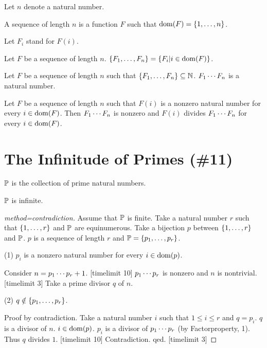 \documentclass{article}
\begin{document}
\begin{forthel}
  Let $n$ denote a natural number.

\begin{definition}
A sequence of length $n$ is a
function $F$ such that $\operatorname{dom}(F) = \{1,\dots,n\}$.
\end{definition}

Let $F_{i}$ stand for $F(i)$.

\begin{definition}
Let $F$ be a sequence of length $n$.
$\{F_{1},\dots,F_{n}\} = \{ F_{i} | i \in \operatorname{dom}(F)\}$.
\end{definition}





\begin{signature}
Let $F$ be a sequence of length $n$
such that $\{F_{1},\dots,F_{n}\} \subseteq \mathbb{N}$.
$F_{1} \cdots F_{n}$ is a natural number.
\end{signature}

\begin{axiom}[title=Factorproperty]
Let $F$ be a sequence of length $n$
such that $F(i)$ is a nonzero natural number for every $i \in \operatorname{dom}(F)$.
Then $F_{1} \cdots F_{n}$ is nonzero and
$F(i)$ divides $F_{1} \cdots F_{n}$ for every $i \in \operatorname{dom}(F)$.
\end{axiom}

\end{forthel}

\section{The Infinitude of Primes (\#11)}

\begin{forthel}

\begin{signature}
$\mathbb{P}$ is the collection of prime natural numbers.
\end{signature}

\begin{theorem}[title=Euclid]
$\mathbb{P}$ is infinite.
\end{theorem}
\begin{proof}[method=contradiction]
Assume that $\mathbb{P}$ is finite.
Take a natural number $r$ such that $\{1,\dots,r\}$ and $\mathbb{P}$ are equinumerous.
Take a bijection $p$ between $\{1,\dots,r\}$ and $\mathbb{P}$.
$p$ is a sequence of length $r$ and
$\mathbb{P} = \{p_{1},\dots,p_{r}\}$.

(1) $p_{i}$ is a nonzero natural number for every
$i \in  \operatorname{dom}(p)$.

Consider $n = p_{1} \cdots p_{r}+1$. [timelimit 10]
$p_{1} \cdots p_{r}$ is nonzero and $n$ is nontrivial. [timelimit 3]
Take a prime divisor $q$ of $n$.

(2) $q \notin \{p_{1},\dots,p_{r}\}$.

Proof by contradiction.
Take a natural number $i$ such that $1 \leq i \leq r$
and $q=p_{i}$.
$q$ is a divisor of $n$.
$i \in \operatorname{dom}(p)$.
$p_{i}$ is a divisor of $p_{1} \cdots p_{r}$
(by Factorproperty, 1).
Thus $q$ divides $1$. [timelimit 10]
Contradiction. qed.
[timelimit 3]
\end{proof}
\end{forthel}

\printbibliography
\end{document}
